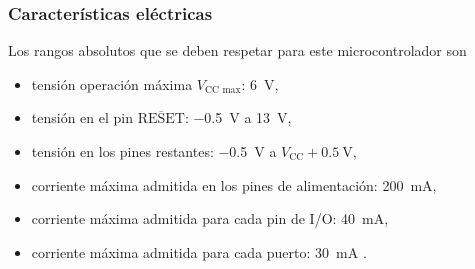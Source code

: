 \subsubsection{Características eléctricas}
Los rangos absolutos que se deben respetar para este microcontrolador son
\begin{itemize}
    \item tensión operación máxima $V_\text{CC max}$: \SI{6}{\volt},
    \item tensión en el pin $\overline{\text{RESET}}$: \SI{-0.5}{\volt} a \SI{13}{\volt},
    \item tensión en los pines restantes: \SI{-0.5}{\volt} a $V_\text{CC} + \SI{0.5}{\volt}$,
    \item corriente máxima admitida en los pines de alimentación: \SI{200}{\milli\ampere},
    \item corriente máxima admitida para cada pin de I/O: \SI{40}{\milli\ampere},
    \item corriente máxima admitida para cada puerto: \SI{30}{\milli\ampere} \cite{datasheet, atmega}.

\end{itemize}

